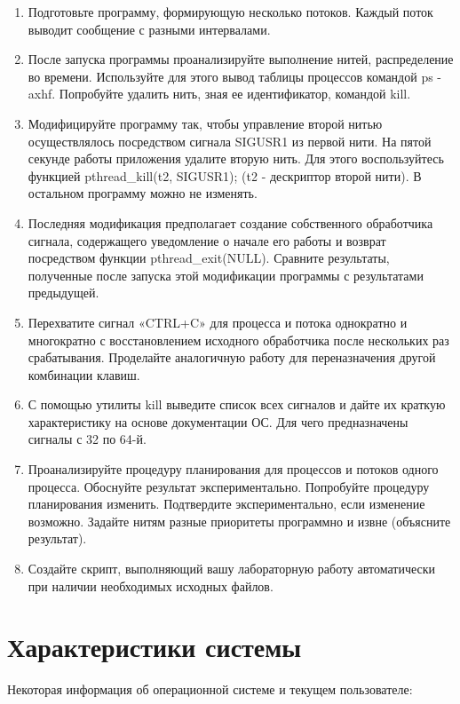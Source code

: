 \documentclass[14pt,a4paper,report]{report}
\begin{document}
\begin{enumerate}
	\item Подготовьте программу, формирующую несколько потоков. Каждый поток выводит сообщение с разными интервалами.
	\item После запуска программы проанализируйте выполнение нитей, распределение во времени. Используйте для этого вывод таблицы процессов командой ps -axhf. Попробуйте удалить нить, зная ее идентификатор, командой kill.
	\item Модифицируйте программу так, чтобы управление второй нитью осуществлялось посредством сигнала SIGUSR1 из первой нити. На пятой секунде работы приложения удалите вторую нить. Для этого воспользуйтесь функцией pthread\_kill(t2, SIGUSR1); (t2 - дескриптор второй нити). В остальном программу можно не изменять.
	\item Последняя модификация предполагает создание собственного обработчика сигнала, содержащего уведомление о начале его работы и возврат посредством функции pthread\_exit(NULL). Сравните результаты, полученные после запуска этой модификации программы с результатами предыдущей.
	\item Перехватите сигнал «CTRL+C» для процесса и потока однократно и многократно с восстановлением исходного обработчика после нескольких раз срабатывания. Проделайте аналогичную работу для переназначения другой комбинации клавиш.
	\item С помощью утилиты kill выведите список всех сигналов и дайте их краткую характеристику на основе документации ОС. Для чего предназначены сигналы с 32 по 64-й.
	\item Проанализируйте процедуру планирования для процессов и потоков одного процесса. Обоснуйте результат экспериментально. Попробуйте процедуру планирования изменить. Подтвердите экспериментально, если изменение возможно. Задайте нитям разные приоритеты программно и извне (объясните результат).
	\item Создайте скрипт, выполняющий вашу лабораторную работу автоматически при наличии необходимых исходных файлов.
\end{enumerate}


\section{Характеристики системы}

Некоторая информация об операционной системе и текущем пользователе:


\end{document}
